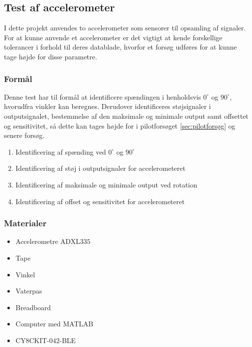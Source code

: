 \subsection{Test af accelerometer}
I dette projekt anvendes to accelerometer som sensorer til opsamling af signaler. For at kunne anvende et accelerometer er det vigtigt at kende forskellige tolerancer i forhold til deres datablade, hvorfor et forsøg udføres for at kunne tage højde for disse parametre.

\subsubsection{Formål}
Denne test har til formål at identificere spændingen i henholdsvis $0^{\circ}$ og $90^{\circ}$, hvorudfra vinkler kan beregnes. Derudover identificeres støjsignaler i outputsignalet, bestemmelse af den maksimale og minimale output samt offsettet og sensitivitet, så dette kan tages højde for i pilotforsøget \autoref{sec:pilotforsøg} og senere forsøg. 

\begin{enumerate}
\item Identificering af spænding ved $0^{\circ}$ og $90^{\circ}$
\item Identificering af støj i outputsignaler for accelerometeret
\item Identificering af maksimale og minimale output ved rotation
\item Identificering af offset og sensitivitet for accelerometeret
\end{enumerate}

\subsubsection{Materialer}
\begin{itemize}
\item Accelerometre ADXL$335$
\item Tape
\item Vinkel
\item Vaterpas
\item Breadboard
\item Computer med MATLAB
\item CY$8$CKIT-$042$-BLE
\end{itemize}

